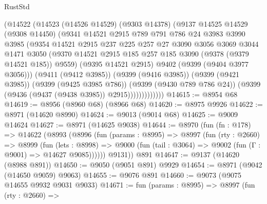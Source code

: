 \begin{lexlean}{RustStd}
\begin{coremodule}
                  (@14522
                    (@14523
                      (@14526 @14529)
                      (@9303 @14378)
                      (@9137
                        @14525
                        @14529
                        (@9308 @14450)
                        (@9341
                          @14521
                          @2915
                          @789
                          @791
                          @786
                          @24
                          @3983
                          @3990
                          @3985
                          (@9354
                            @14521
                            @2915
                            @237
                            @225
                            @257
                            @27
                            @3090
                            @3056
                            @3069
                            @3044
                            @1471
                            @3050
                            (@9370
                              @14521
                              @2915
                              @185
                              @257
                              @185
                              @3090
                              (@9378 (@9379 @14521 @185))
                              @9559)
                            (@9395 @14521 @2915)
                            @9402
                            (@9399 (@9404 @3977 @3056)))
                          (@9411 (@9412 @3985))
                          (@9399 (@9416 @3985))
                          (@9399 (@9421 @3985))
                          (@9399 (@9425 @3985 @786))
                          (@9399 (@9430 @789 @786 @24))
                          (@9399 (@9436 (@9437 (@9438 @3985)) @2915)))))))))))))
@14615 := @8954 @68
@14619 := @8956 (@8960 @68) (@8966 @68)
@14620 := @8975 @9926
@14622 := @8971 (@14620 @8990)
@14624 := @9013 (@9014 @68)
@14625 := @9009 @14624
@14627 := @8971 (@14625 @9038)
@14644 := @8970
    (fun (fn : @178) =>
    @14622
      (@8993
        (@8996
          (fun (params : @8995) =>
          @8997
            (fun (rty : @2660) =>
            @8999
              (fun (lets : @8998) =>
              @9000 (fun (tail : @3064) => @9002 (fun (Γ : @9001) => @14627 @9085))))))
        @9131))
    @891
@14647 := @9137 (@14620 (@8988 @891))
@14650 := @9050 (@9051 @891) @9929
@14654 := @8971 (@9042 (@14650 @9059) @9063)
@14655 := @9076 @891
@14660 := @9073 (@9075 @14655 @9932 @9031 @9033)
@14671 := fun (params : @8995) =>
  @8997
    (fun (rty : @2660) =>

\end{coremodule}
\end{lexlean}
